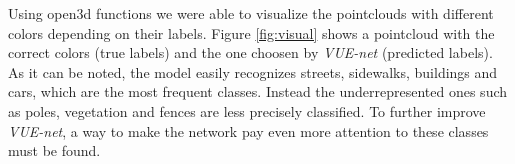 Using open3d functions we were able to visualize the pointclouds with different colors depending
on their labels. Figure \ref{fig:visual} shows a pointcloud with the
correct colors (true labels) and the one choosen by \textit{VUE-net} (predicted labels).
As it can be noted, the model easily recognizes streets, sidewalks, buildings and cars, 
which are the most frequent classes. Instead the underrepresented ones such as poles, vegetation
and fences are less precisely classified. To further improve \textit{VUE-net}, a way to
make the network pay even more attention to these classes must be found.